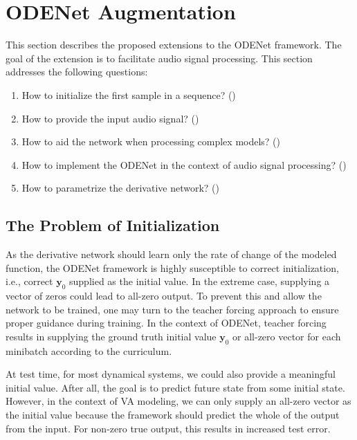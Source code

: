 \section{ODENet Augmentation}

This section describes the proposed extensions to the ODENet framework. The goal of the extension is to facilitate audio signal processing. This section addresses the following questions:
\begin{enumerate}
  \item How to initialize the first sample in a sequence? ()
  \item How to provide the input audio signal? ()
  \item How to aid the network when processing complex models? ()
  \item How to implement the ODENet in the context of audio signal processing? ()
  \item How to parametrize the derivative network? ()
\end{enumerate}

\subsection{The Problem of Initialization}
\label{subsec:initialization}

As the derivative network should learn only the rate of change of the modeled function, the ODENet framework is highly susceptible to correct initialization, i.e., correct $\pmb{y}_0$ supplied as the initial value. In the extreme case, supplying a vector of zeros could lead to all-zero output. To prevent this and allow the network to be trained, one may turn to the teacher forcing approach
to ensure proper guidance during training. In the context of ODENet, teacher forcing results in supplying the ground truth initial value $\pmb{y}_0$ or all-zero vector for each minibatch according to the curriculum.

At test time, for most dynamical systems, we could also provide a meaningful initial value. After all, the goal is to predict future state from some initial state. However, in the context of \ac{VA} modeling, we can only supply an all-zero vector as the initial value because the framework should predict the whole of the output from the input. For non-zero true output, this results in increased test error.

